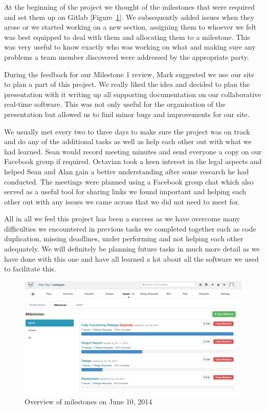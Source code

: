 \documentclass[a4wide, 11pt]{article}
\begin{document}
At the beginning of the project we thought of the milestones that were required and set them up on Gitlab [Figure~\ref{fig:Github}]. We subsequently added issues when they arose or we started working on a new section, assigning them to whoever we felt was best equipped to deal with them and allocating them to a milestone. This was very useful to know exactly who was working on what and making sure any problems a team member discovered were addressed by the appropriate party. 

During the feedback for our Milestone 1 review, Mark suggested we use our site to plan a part of this project. We really liked the idea and decided to plan the presentation with it writing up all supporting documentation on our collaborative real-time software. This was not only useful for the organisation of the presentation but allowed us to find minor bugs and improvements for our site. 

We usually met every two to three days to make sure the project was on track and do any of the additional tasks as well as help each other out with what we had learned. Sean would record meeting minutes and send everyone a copy on our Facebook group if required. Octavian took a keen interest in the legal aspects and helped Sean and Alan gain a better understanding after some research he had conducted. The meetings were planned using a Facebook group chat which also served as a useful tool for sharing links we found important and helping each other out with any issues we came across that we did not need to meet for.

All in all we feel this project has been a success as we have overcome many difficulties we encountered in previous tasks we completed together such as code duplication, missing deadlines, under performing and not helping each other adequately. We will definitely be planning future tasks in much more detail as we have done with this one and have all learned a lot about all the software we used to facilitate this.

\begin{figure}
  \includegraphics[width=1\textwidth]{gitlab-milestones.png}
  \caption{Overview of milestones on June 10, 2014}
  \label{fig:Github}
\end{figure}
\end{document}
